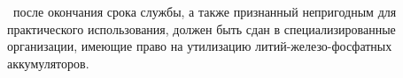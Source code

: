 \begin{samepage}
	\point
	\dut \ после окончания срока службы, а также признанный непригодным для практического использования, должен быть сдан в специализированные организации, имеющие право на утилизацию литий-железо-фосфатных аккумуляторов.
\end{samepage}